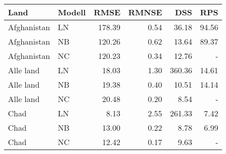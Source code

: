 
\begin{tabular}[t]{llrrrr}
\toprule
Land & Modell & RMSE & RMNSE & DSS & RPS\\
\midrule
Afghanistan & LN & 178.39 & 0.54 & 36.18 & 94.56\\
Afghanistan & NB & 120.26 & 0.62 & 13.64 & 89.37\\
Afghanistan & NC & 120.23 & 0.34 & 12.76 & -\\
\addlinespace
Alle land & LN & 18.03 & 1.30 & 360.36 & 14.61\\
Alle land & NB & 19.38 & 0.40 & 10.51 & 14.14\\
Alle land & NC & 20.48 & 0.20 & 8.54 & -\\
\addlinespace
Chad & LN & 8.13 & 2.55 & 261.33 & 7.42\\
Chad & NB & 13.00 & 0.22 & 8.78 & 6.99\\
Chad & NC & 12.42 & 0.17 & 9.63 & -\\
\bottomrule
\end{tabular}